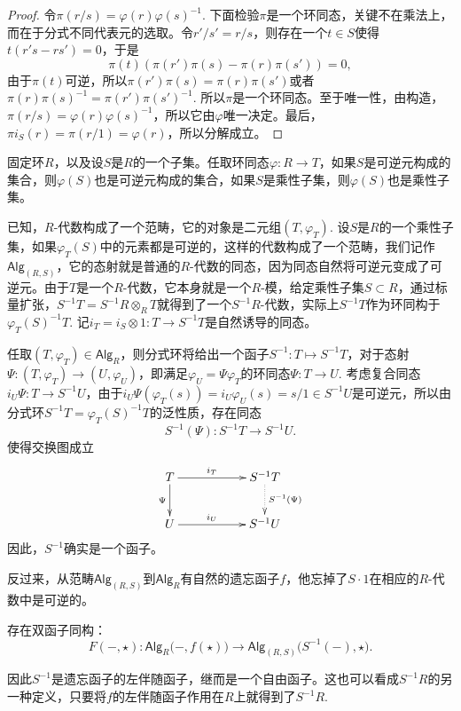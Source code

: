 \begin{proof}
	令$\pi(r/s)=\varphi(r)\varphi(s)^{-1}$. 下面检验$\pi$是一个环同态，关键不在乘法上，而在于分式不同代表元的选取。令$r'/s'=r/s$，则存在一个$t\in S$使得$t(r's-rs')=0$，于是
	\[
		\pi(t)(\pi(r')\pi(s)-\pi(r)\pi(s'))=0,
	\]
	由于$\pi(t)$可逆，所以$\pi(r')\pi(s)=\pi(r)\pi(s')$或者$\pi(r)\pi(s)^{-1}=\pi(r')\pi(s')^{-1}$. 所以$\pi$是一个环同态。至于唯一性，由构造，$\pi(r/s)=\varphi(r)\varphi(s)^{-1}$，所以它由$\varphi$唯一决定。最后，$\pi i_S(r)=\pi(r/1)=\varphi(r)$，所以分解成立。
\end{proof}

\para 固定环$R$，以及设$S$是$R$的一个子集。任取环同态$\varphi:R\to T$，如果$S$是可逆元构成的集合，则$\varphi(S)$也是可逆元构成的集合，如果$S$是乘性子集，则$\varphi(S)$也是乘性子集。

已知，$R$-代数构成了一个范畴，它的对象是二元组$(T,\varphi_T)$. 设$S$是$R$的一个乘性子集，如果$\varphi_T(S)$中的元素都是可逆的，这样的代数构成了一个范畴，我们记作$\mathsf{Alg}_{(R,S)}$，它的态射就是普通的$R$-代数的同态，因为同态自然将可逆元变成了可逆元。由于$T$是一个$R$-代数，它本身就是一个$R$-模，给定乘性子集$S\subset R$，通过标量扩张，$S^{-1}T=S^{-1}R\otimes_R T$就得到了一个$S^{-1}R$-代数，实际上$S^{-1}T$作为环同构于$\varphi_T(S)^{-1}T$. 记$i_T=i_S\otimes 1:T\to S^{-1}T$是自然诱导的同态。

任取$(T,\varphi_T)\in \mathsf{Alg}_R$，则分式环将给出一个函子$S^{-1}:T\mapsto S^{-1}T$，对于态射$\Psi:(T,\varphi_T)\to (U,\varphi_U)$，即满足$\varphi_U=\Psi\varphi_T$的环同态$\Psi:T\to U$. 考虑复合同态$i_{U}\Psi:T\to S^{-1}U$，由于$i_{U}\Psi(\varphi_T(s))=i_{U}\varphi_U(s)=s/1\in S^{-1}U$是可逆元，所以由分式环$S^{-1}T=\varphi_T(S)^{-1}T$的泛性质，存在同态
\[
	S^{-1}(\Psi):S^{-1}T\to S^{-1}U.
\]
使得交换图成立
\[
\begin{xy}
	\xymatrix{
		T\ar[rr]^-{i_T} \ar[d]_-{\Psi}&&S^{-1}T \ar@{.>}[d]^-{S^{-1}(\Psi)}\\
		U\ar[rr]^-{i_U} &&S^{-1}U
	}
\end{xy}
\]
因此，$S^{-1}$确实是一个函子。

反过来，从范畴$\mathsf{Alg}_{(R,S)}$到$\mathsf{Alg}_R$有自然的遗忘函子$f$，他忘掉了$S\cdot 1$在相应的$R$-代数中是可逆的。

\begin{thm}
存在双函子同构：
\[
	F(-,\star):\mathsf{Alg}_R\bigl(-,f(\star)\bigr)\to \mathsf{Alg}_{(R,S)}\bigl(S^{-1}(-),\star\bigr).
\]
\end{thm}

因此$S^{-1}$是遗忘函子的左伴随函子，继而是一个自由函子。这也可以看成$S^{-1}R$的另一种定义，只要将$f$的左伴随函子作用在$R$上就得到了$S^{-1}R$.


